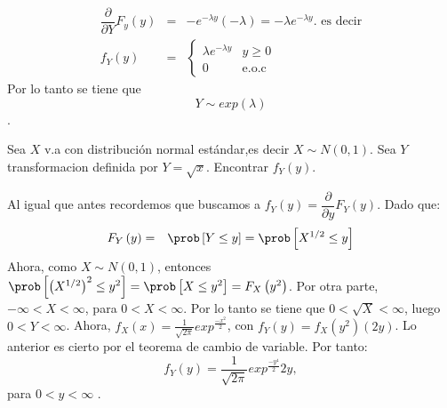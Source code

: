 \begin{Ejem}
\begin{eqnarray*}
\dfrac{\partial}{\partial Y} F_{y} \left( y \right) &=& -e^{-\lambda y} \left(-\lambda \right) = -\lambda e^{-\lambda y}. \, \, \textrm{es decir}\\
f_{Y}\left(y \right) &=& \left\{
\begin{array}{cc} 
\lambda e^{-\lambda y} &y \geq 0 \\
0 &  \textrm{e.o.c}
\end{array}
\right.
\end{eqnarray*} 
 Por lo tanto se tiene que
$$Y \sim exp \left( \lambda \right)$$ .
\end{Ejem}  

\begin{Ejem}
Sea $X$ v.a con distribuci\'on normal est\'andar,es decir $X \sim N\left(0,1 \right)$. Sea $Y$ transformacion definida por  $Y= \sqrt{x}$. Encontrar $f_{Y}\left(y\right)$.

Al igual que antes recordemos que buscamos a $f_{Y}\left(y\right)=\dfrac{\partial}{\partial y}F_{Y}\left(y\right)$. Dado que:
\begin{eqnarray*}
F_{Y}\left(y\right) &=&\prob \left[ Y \leq y\right] = \prob \left[ X^{1/2}\leq y\right]
\end{eqnarray*}
Ahora, como $ X\sim N \left(0,1 \right)$, entonces $ \prob \left[ \left( X^{1/2} \right)^{2} \leq y^{2} \right]=
 \prob \left[ X \leq y^{2} \right] = F_{X}\left(y^{2} \right)$. Por otra parte, $-\infty < X < \infty$, para $0 < X < \infty$. Por lo tanto se tiene que $0 < \sqrt{X} < \infty$, luego $0 < Y < \infty$. Ahora, $f_{X}\left( x \right)=\frac{1}{\sqrt{2 \pi}}exp ^{\frac{-x^{2}}{2}}$, con $f_{Y}\left(y\right)= f_{X}\left(y^{2}\right)\left(2y\right)$. Lo anterior es cierto por el teorema de cambio de variable. Por tanto:
 $$f_{Y}\left(y\right)= \frac{1}{\sqrt{2\pi}} exp^{ \frac{-y^4}{2}} 2y,$$
para $0<y< \infty$ .
\end{Ejem}

